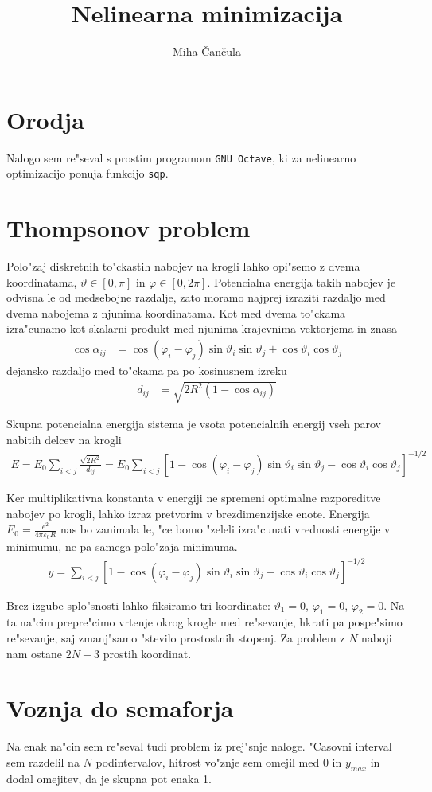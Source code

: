 \documentclass[a4paper,10pt]{article}
\title{Nelinearna minimizacija}
\author{Miha \v Can\v cula}
\renewcommand{\phi}{\varphi}
\renewcommand{\theta}{\vartheta}
\begin{document}
\maketitle

\section{Orodja}
Nalogo sem re"seval s prostim programom \texttt{GNU Octave}, ki za nelinearno optimizacijo ponuja funkcijo \texttt{sqp}. 

\section{Thompsonov problem}
Polo"zaj diskretnih to"ckastih nabojev na krogli lahko opi"semo z dvema koordinatama, $\theta\in[0,\pi]$ in $\phi\in[0,2\pi]$. Potencialna energija takih nabojev je odvisna le od medsebojne razdalje, zato moramo najprej izraziti razdaljo med dvema nabojema z njunima koordinatama. Kot med dvema to"ckama izra"cunamo kot skalarni produkt med njunima krajevnima vektorjema in znasa
\begin{align}
  \cos \alpha_{ij} &= \cos (\phi_i-\phi_j) \sin \theta_i \sin \theta_j + \cos \theta_i \cos\theta_j
\end{align}
dejansko razdaljo med to"ckama pa po kosinusnem izreku
\begin{align}
  d_{ij} &= \sqrt{2R^2(1 - \cos\alpha_{ij})}
\end{align}

Skupna potencialna energija sistema je vsota potencialnih energij vseh parov nabitih delcev na krogli
\begin{align}
  E = E_0 \sum_{i<j} \frac{\sqrt{2R^2}}{d_{ij}} = E_0 \sum_{i<j} \left[ 1 - \cos (\phi_i-\phi_j) \sin \theta_i \sin \theta_j - \cos \theta_i \cos\theta_j \right]^{-1/2} 
\end{align}

Ker multiplikativna konstanta v energiji ne spremeni optimalne razporeditve nabojev po krogli, lahko izraz pretvorim v brezdimenzijske enote. Energija $E_0 = \frac{e^2}{4\pi\varepsilon_0 R}$ nas bo zanimala le, "ce bomo "zeleli izra"cunati vrednosti energije v minimumu, ne pa samega polo"zaja minimuma. 
\begin{align}
  y = \sum_{i<j} \left[ 1 - \cos (\phi_i-\phi_j) \sin \theta_i \sin \theta_j - \cos \theta_i \cos\theta_j\right]^{-1/2} 
\end{align}

Brez izgube splo"snosti lahko fiksiramo tri koordinate: $\theta_1 = 0$, $\phi_1 = 0$, $\phi_2 = 0$. Na ta na"cim prepre"cimo vrtenje okrog krogle med re"sevanje, hkrati pa pospe"simo re"sevanje, saj zmanj"samo "stevilo prostostnih stopenj. Za problem z $N$ naboji nam ostane $2N-3$ prostih koordinat. 

\section{Voznja do semaforja}
Na enak na"cin sem re"seval tudi problem iz prej"snje naloge. "Casovni interval sem razdelil na $N$ podintervalov, hitrost vo"znje sem omejil med 0 in $y_{max}$ in dodal omejitev, da je skupna pot enaka 1. 
\end{document}
